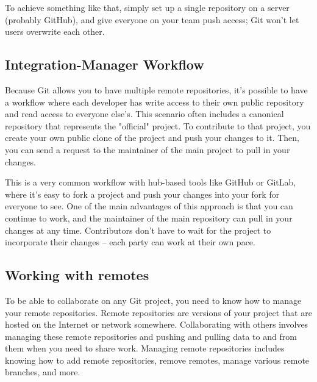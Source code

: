 \documentclass[12pt,a4]{article}
\begin{document}
To achieve something like that, simply set up a single repository on a server
(probably GitHub), and give everyone on your team push access; Git won't let
users overwrite each other.

\subsection{Integration-Manager Workflow}
Because Git allows you to have multiple remote repositories, it’s possible to
have a workflow where each developer has write access to their own public
repository and read access to everyone else’s. This scenario often includes a
canonical repository that represents the "official" project. To contribute to
that project, you create your own public clone of the project and push your
changes to it. Then, you can send a request to the maintainer of the main
project to pull in your changes.

\begin{center}
\end{center}

This is a very common workflow with hub-based tools like GitHub or GitLab, where
it’s easy to fork a project and push your changes into your fork for everyone to
see. One of the main advantages of this approach is that you can continue to
work, and the maintainer of the main repository can pull in your changes at any
time. Contributors don’t have to wait for the project to incorporate their
changes -- each party can work at their own pace.

\subsection{Working with remotes}
To be able to collaborate on any Git project, you need to know how to manage
your remote repositories. Remote repositories are versions of your project that
are hosted on the Internet or network somewhere. Collaborating with others
involves managing these remote repositories and pushing and pulling data to and
from them when you need to share work. Managing remote repositories includes
knowing how to add remote repositories, remove remotes, manage various remote
branches, and more.
\end{document}
